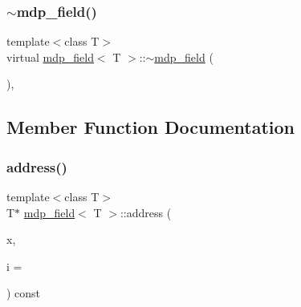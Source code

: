 \mbox{\label{classmdp__field_a98c85b56205d56d48ff740abb5d5cbb8}} 
\subsubsection{\texorpdfstring{$\sim$mdp\+\_\+field()}{~mdp\_field()}}
{\footnotesize\ttfamily template$<$class T$>$ \\
virtual \hyperlink{classmdp__field}{mdp\+\_\+field}$<$ T $>$\+::$\sim$\hyperlink{classmdp__field}{mdp\+\_\+field} (\begin{DoxyParamCaption}{ }\end{DoxyParamCaption})\hspace{0.3cm}{\ttfamily [inline]}, {\ttfamily [virtual]}}



\subsection{Member Function Documentation}
\mbox{\label{classmdp__field_a11f964e8fdfa1eae4e40ee31d2a9469c}} 
\subsubsection{\texorpdfstring{address()}{address()}}
{\footnotesize\ttfamily template$<$class T$>$ \\
T$\ast$ \hyperlink{classmdp__field}{mdp\+\_\+field}$<$ T $>$\+::address (\begin{DoxyParamCaption}\item[{\hyperlink{classmdp__site}{mdp\+\_\+site}}]{x,  }\item[{int}]{i = {} }\end{DoxyParamCaption}) const\hspace{0.3cm}{\ttfamily [inline]}}

\mbox{\label{classmdp__field_ab76ac5e0273aa3e1b5070fc3d7a0dc84}} 
